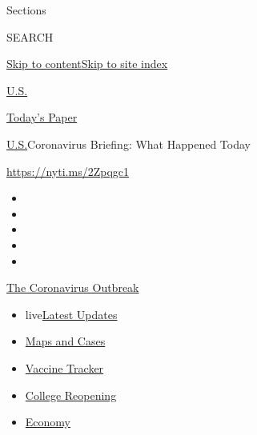 Sections

SEARCH

\protect\hyperlink{site-content}{Skip to
content}\protect\hyperlink{site-index}{Skip to site index}

\href{https://www.nytimes3xbfgragh.onion/section/us}{U.S.}

\href{https://myaccount.nytimes3xbfgragh.onion/auth/login?response_type=cookie\&client_id=vi}{}

\href{https://www.nytimes3xbfgragh.onion/section/todayspaper}{Today's
Paper}

\href{/section/us}{U.S.}\textbar{}Coronavirus Briefing: What Happened
Today

\url{https://nyti.ms/2Zpqgc1}

\begin{itemize}
\item
\item
\item
\item
\item
\end{itemize}

\href{https://www.nytimes3xbfgragh.onion/news-event/coronavirus?action=click\&pgtype=Article\&state=default\&region=TOP_BANNER\&context=storylines_menu}{The
Coronavirus Outbreak}

\begin{itemize}
\tightlist
\item
  live\href{https://www.nytimes3xbfgragh.onion/2020/08/04/world/coronavirus-cases.html?action=click\&pgtype=Article\&state=default\&region=TOP_BANNER\&context=storylines_menu}{Latest
  Updates}
\item
  \href{https://www.nytimes3xbfgragh.onion/interactive/2020/us/coronavirus-us-cases.html?action=click\&pgtype=Article\&state=default\&region=TOP_BANNER\&context=storylines_menu}{Maps
  and Cases}
\item
  \href{https://www.nytimes3xbfgragh.onion/interactive/2020/science/coronavirus-vaccine-tracker.html?action=click\&pgtype=Article\&state=default\&region=TOP_BANNER\&context=storylines_menu}{Vaccine
  Tracker}
\item
  \href{https://www.nytimes3xbfgragh.onion/2020/08/02/us/covid-college-reopening.html?action=click\&pgtype=Article\&state=default\&region=TOP_BANNER\&context=storylines_menu}{College
  Reopening}
\item
  \href{https://www.nytimes3xbfgragh.onion/live/2020/08/04/business/stock-market-today-coronavirus?action=click\&pgtype=Article\&state=default\&region=TOP_BANNER\&context=storylines_menu}{Economy}
\end{itemize}

